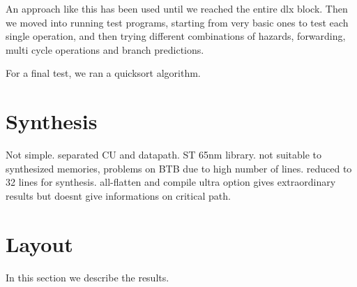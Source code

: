 \documentclass[12pt]{article}
\begin{document}
An approach like this has been used until we reached the entire dlx block.
Then we moved into running test programs, starting from very basic ones to test each single operation, and then trying different combinations of hazards, forwarding, multi cycle operations and branch predictions.

For a final test, we ran a quicksort algorithm.

  

\section{Synthesis}\label{Synthesis}
Not simple. separated CU and datapath.
ST 65nm library. not suitable to synthesized memories, problems on BTB due to high number of lines. reduced to 32 lines for synthesis. 
all-flatten and compile ultra option gives extraordinary results but doesnt give informations on critical path.



\section{Layout}\label{Layout}
In this section we describe the results.



\end{document}
